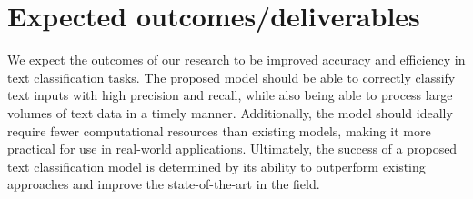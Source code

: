 \section{Expected outcomes/deliverables}
We expect the outcomes of our research to be improved accuracy and efficiency in text classification tasks. The proposed model should be able to correctly classify text inputs with high precision and recall, while also being able to process large volumes of text data in a timely manner. Additionally, the model should ideally require fewer computational resources than existing models, making it more practical for use in real-world applications. Ultimately, the success of a proposed text classification model is determined by its ability to outperform existing approaches and improve the state-of-the-art in the field.
